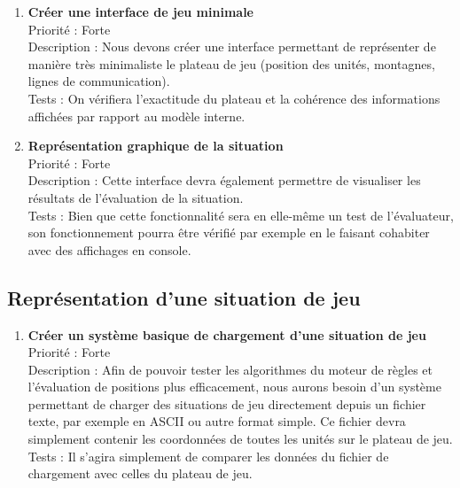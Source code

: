 			\begin{enumerate}

				\item \textbf{Créer une interface de jeu minimale} 
				\\[0.7\baselineskip]
				Priorité : Forte 
				\\[0.7\baselineskip]
				Description : Nous devons créer une interface permettant de représenter de manière très minimaliste le plateau de jeu (position des unités, 
				montagnes, lignes de communication). 
				\\[0.7\baselineskip]
				Tests : On vérifiera l'exactitude du plateau et la cohérence des informations affichées par rapport au modèle interne. 
				\\[0.7\baselineskip]

				\item \textbf{Représentation graphique de la situation} 
				\\[0.7\baselineskip]
				Priorité : Forte 
				\\[0.7\baselineskip]
				Description : Cette interface devra également permettre de visualiser les résultats de l'évaluation de la situation.
				\\[0.7\baselineskip]
				Tests : Bien que cette fonctionnalité sera en elle-même un test de l'évaluateur, son fonctionnement pourra être vérifié par exemple en 
				le faisant cohabiter avec des affichages en console. 
				\\[0.7\baselineskip]

				
			\end{enumerate}

		\subsection{Représentation d'une situation de jeu}

			\begin{enumerate}

				\item \textbf{Créer un système basique de chargement d'une situation de jeu} 
				\\[0.7\baselineskip]
				Priorité : Forte 
				\\[0.7\baselineskip]
				Description : Afin de pouvoir tester les algorithmes du moteur de règles et l'évaluation de positions plus efficacement, nous aurons besoin 
				d'un système permettant de charger des situations de jeu directement depuis un fichier texte, par exemple en ASCII ou autre format simple. 
				Ce fichier devra simplement contenir les coordonnées de toutes les unités sur le plateau de jeu. 
				\\[0.7\baselineskip]
				Tests : Il s'agira simplement de comparer les données du fichier de chargement avec celles du plateau de jeu. 
				\\[0.7\baselineskip]
				
			\end{enumerate}

